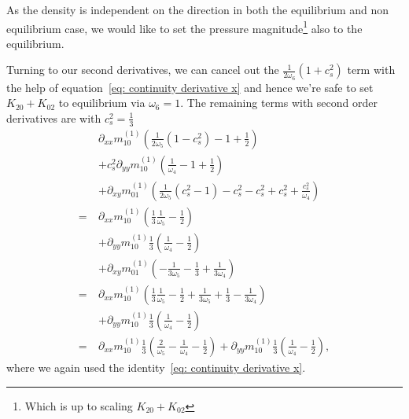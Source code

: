 As the density is independent on the direction in both the equilibrium and non equilibrium case, we would like to set the pressure magnitude\footnote{Which is up to scaling $K_{20} + K_{02}$} also to the equilibrium.

Turning to our second derivatives, we can cancel out the $\frac{1}{2\omega_6}(1+c_s^2)$ term with the help of equation~\eqref{eq: continuity derivative x} and hence we're safe to set $K_{20} + K_{02}$ to equilibrium via $\omega_6=1$.
The remaining terms with second order derivatives are with $c_s^2=\frac{1}{3}$
\begin{align}
  \label{eq: diffusive start}
  &\partial_{xx} m_{10}^{(1)} \left(
     \frac{1}{2\omega_5} (1 - c_s^2)
     - 1
     + \frac{1}{2}
  \right)
  \\&
  \nonumber
  + c_s^2\partial_{yy} m_{10}^{(1)} \left(
    \frac{1}{\omega_4}
    - 1
    + \frac{1}{2}
  \right)
  \\&
  \nonumber
  + \partial_{xy} m_{01}^{(1)} \left(
    \frac{1}{2\omega_5} (c_s^2 - 1)
    - c_s^2
    - c_s^2
    + c_s^2
    + \frac{c_s^2}{\omega_4}
  \right)
  \\=\ &
  \nonumber
  \partial_{xx} m_{10}^{(1)} \left(
    \frac{1}{3}\frac{1}{\omega_5}
    - \frac{1}{2}
  \right)
  \\&
  \nonumber
  + \partial_{yy} m_{10}^{(1)} \frac{1}{3}\left(
    \frac{1}{\omega_4}
    - \frac{1}{2}
  \right)
  \\&
  \nonumber
  + \partial_{xy} m_{01}^{(1)} \left(
    - \frac{1}{3\omega_5}
    - \frac{1}{3}
    + \frac{1}{3\omega_4}
  \right)
  \\=\ &
  \nonumber
  \partial_{xx} m_{10}^{(1)} \left(
    \frac{1}{3}\frac{1}{\omega_5}
    - \frac{1}{2}
    + \frac{1}{3\omega_5}
    + \frac{1}{3}
    - \frac{1}{3\omega_4}
  \right)
  \\&
  \nonumber
  + \partial_{yy} m_{10}^{(1)} \frac{1}{3}\left(
    \frac{1}{\omega_4}
    - \frac{1}{2}
  \right)
  \\=\ &
  \nonumber
  \partial_{xx} m_{10}^{(1)} \frac{1}{3} \left(
    \frac{2}{\omega_5}
    - \frac{1}{\omega_4}
    - \frac{1}{2}
  \right)
  + \partial_{yy} m_{10}^{(1)} \frac{1}{3}\left(
    \frac{1}{\omega_4}
    - \frac{1}{2}
  \right),
\end{align}
where we again used the identity~\eqref{eq: continuity derivative x}.

